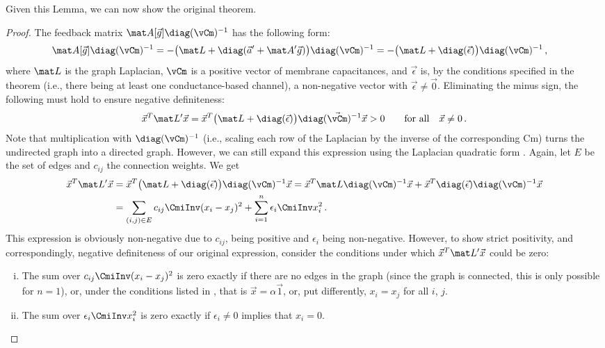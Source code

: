 Given this Lemma, we can now show the original theorem.

\ThmNlifConvergence*

\begin{proof}
The feedback matrix $\mat A[\vec g] \diag(\vCm)^{-1}$ has the following form:
\begin{align*}
	\mat A[\vec g] \diag(\vCm)^{-1}
	&= -\bigl( \mat L + \diag(\vec a' + \mat A' \vec g) \bigr) \diag(\vCm)^{-1} 
	 = -\bigl( \mat L + \diag(\vec \epsilon) \bigr) \diag(\vCm)^{-1}  \,,
\end{align*}
where $\mat L$ is the graph Laplacian, $\vCm$ is a positive vector of membrane capacitances, and $\vec \epsilon$ is, by the conditions specified in the theorem (i.e., there being at least one conductance-based channel), a non-negative vector with $\vec \epsilon \neq \vec 0$.
Eliminating the minus sign, the following must hold to ensure negative definiteness:
\begin{align*}
	 \vec x^T \mat L' \vec x 
	 	= \vec x^T \bigl( \mat L + \diag(\vec \epsilon) \bigr) \diag(\vec \vCm)^{-1} \vec x
	 	> 0 \quad\quad \text{for all} \quad \vec x \neq 0 \,.
\end{align*}
Note that multiplication with $\diag(\vCm)^{-1}$ (i.e., scaling each row of the Laplacian by the inverse of the corresponding \gls{Cm}) turns the undirected graph into a directed graph.
However, we can still expand this expression using the Laplacian quadratic form \citep[cf.][Section~18.3.5]{spielman2012spectral}.
Again, let $E$ be the set of edges and $c_{ij}$ the connection weights.
We get
\begin{align*}
	\vec x^T \mat L' \vec x
	&= \vec x^T \bigl( \mat L + \diag(\vec \epsilon) \bigr) \diag(\vCm)^{-1} \vec x
	 = \vec x^T \mat L \diag(\vCm)^{-1} \vec x
	 + \vec x^T \diag(\vec \epsilon) \diag(\vCm)^{-1} \vec x \\
	&= \sum_{(i, j) \in E} c_{ij} \CmiInv (x_i - x_j)^2 + \sum_{i = 1}^n \epsilon_i \CmiInv x_i^2 \,.
\end{align*}
This expression is obviously non-negative due to $c_{ij}$, \CmiInv being positive and $\epsilon_i$ being non-negative.
However, to show strict positivity, and correspondingly, negative definiteness of our original expression, consider the conditions under which $\vec x^T \mat L' \vec x$ could be zero:
\begin{enumerate}[(i)]
	\item The sum over $c_{ij} \CmiInv (x_i - x_j)^2$ is zero exactly if there are no edges in the graph (since the graph is connected, this is only possible for $n = 1$), or, under the conditions listed in , that is $\vec x = \alpha \vec{1}$, or, put differently, $x_i = x_j$ for all $i$, $j$.
	\item The sum over $\epsilon_i \CmiInv x_i^2$ is zero exactly if $\epsilon_i \neq 0$ implies that $x_i = 0$.
\end{enumerate}


\end{proof}
